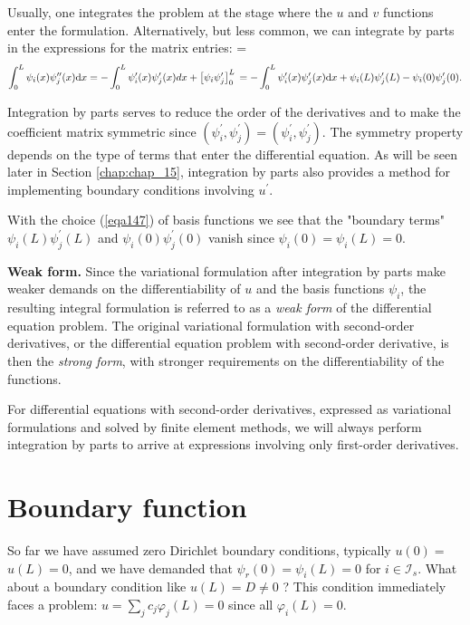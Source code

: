 \documentclass[../main.tex]{subfiles}
\begin{document}
	\noindent Usually, one integrates the problem at the stage where the $u$ and $v$ functions enter the formulation. Alternatively, but less common, we can integrate by parts in the expressions for the matrix entries:
	=
	\begin{equation}
		\label{eqa162}
		\int_{0}^{L} \psi_{i}(x) \psi_{j}^{\prime \prime}(x) \mathrm{d} x =-\int_{0}^{L} \psi_{i}^{\prime}(x) \psi_{j}^{\prime}(x) d x+\left[\psi_{i} \psi_{j}^{\prime}\right]_{0}^{L} \\
		=-\int_{0}^{L} \psi_{i}^{\prime}(x) \psi_{j}^{\prime}(x) \mathrm{d} x+\psi_{i}(L) \psi_{j}^{\prime}(L)-\psi_{i}(0) \psi_{j}^{\prime}(0) .
	\end{equation}

	\noindent Integration by parts serves to reduce the order of the derivatives and to make the coefficient matrix symmetric since $\left(\psi_{i}^{\prime}, \psi_{j}^{\prime}\right)=\left(\psi_{i}^{\prime}, \psi_{j}^{\prime}\right)$. The symmetry property depends on the type of terms that enter the differential equation. As will be seen later in Section \ref{chap:chap_15}, integration by parts also provides a method for implementing boundary conditions involving $u^{\prime}$.
	
	With the choice (\ref{eqa147}) of basis functions we see that the "boundary terms" $\psi_{i}(L) \psi_{j}^{\prime}(L)$ and $\psi_{i}(0) \psi_{j}^{\prime}(0)$ vanish since $\psi_{i}(0)=\psi_{i}(L)=0$.
	
	\noindent \textbf{Weak form.   } Since the variational formulation after integration by parts make weaker demands on the differentiability of $u$ and the basis functions $\psi_{i}$, the resulting integral formulation is referred to as a \emph{weak form} of the differential equation problem. The original variational formulation with second-order derivatives, or the differential equation problem with second-order derivative, is then the \emph{strong form}, with stronger requirements on the differentiability of the functions.
	
	For differential equations with second-order derivatives, expressed as variational formulations and solved by finite element methods, we will always perform integration by parts to arrive at expressions involving only first-order derivatives.

\section[Boundary function]{Boundary function} 
	\label{sec:sec_11_11}
	\noindent So far we have assumed zero Dirichlet boundary conditions, typically $u(0)=$ $u(L)=0$, and we have demanded that $\psi_{r}(0)=\psi_{i}(L)=0$ for $i \in \mathcal{I}_{s}$. What about a boundary condition like $u(L)=D \neq 0$ ? This condition immediately faces a problem: $u=\sum_{j} c_{j} \varphi_{j}(L)=0$ since all $\varphi_{i}(L)=0$.
	
\end{document}
